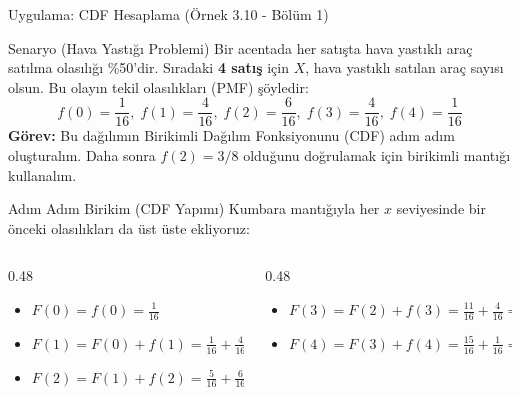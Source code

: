\documentclass[light]{lutbeamer}
\begin{document}
\begin{frame}{Uygulama: CDF Hesaplama (Örnek 3.10 - Bölüm 1)}
    \footnotesize
    \begin{block}{Senaryo (Hava Yastığı Problemi)}
      Bir acentada her satışta hava yastıklı araç satılma olasılığı \%50'dir. Sıradaki \textbf{4 satış} için $X$, hava yastıklı satılan araç sayısı olsun.
      Bu olayın tekil olasılıkları (PMF) şöyledir:
      \[
      f(0)=\frac{1}{16}, \; f(1)=\frac{4}{16}, \; f(2)=\frac{6}{16}, \; f(3)=\frac{4}{16}, \; f(4)=\frac{1}{16}
      \]
      \textbf{Görev:} Bu dağılımın Birikimli Dağılım Fonksiyonunu (CDF) adım adım oluşturalım. Daha sonra $f(2) = 3/8$ olduğunu doğrulamak için birikimli mantığı kullanalım.
    \end{block}
    
    \begin{exampleblock}{Adım Adım Birikim (CDF Yapımı)}
      Kumbara mantığıyla her $x$ seviyesinde bir önceki olasılıkları da üst üste ekliyoruz:
      \vspace{0.1cm}
      \begin{columns}[T]
          \begin{column}{0.48\textwidth}
              \begin{itemize}
                  \item $F(0) = f(0) = \frac{1}{16}$
                  \item $F(1) = F(0) + f(1) = \frac{1}{16} + \frac{4}{16} = \frac{5}{16}$
                  \item $F(2) = F(1) + f(2) = \frac{5}{16} + \frac{6}{16} = \frac{11}{16}$
              \end{itemize}
          \end{column}
          \begin{column}{0.48\textwidth}
              \begin{itemize}
                  \item $F(3) = F(2) + f(3) = \frac{11}{16} + \frac{4}{16} = \frac{15}{16}$
                  \item $F(4) = F(3) + f(4) = \frac{15}{16} + \frac{1}{16} = \mathbf{1} \;\checkmark$
              \end{itemize}
          \end{column}
      \end{columns}
      \vspace{0.1cm}
    \end{exampleblock}
\end{frame}
\end{document}
